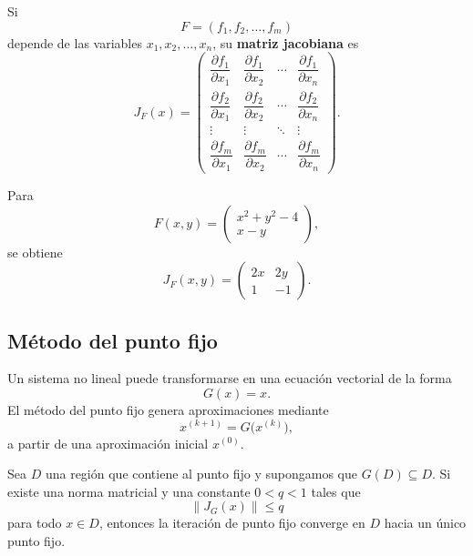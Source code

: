 \documentclass[a4,11pt]{aleph-notas}
\begin{document}
\begin{defi}
    Si
    \[
        F=(f_1,f_2,\ldots,f_m)
    \]
    depende de las variables $x_1,x_2,\ldots,x_n$, su \textbf{matriz jacobiana} es
    \[
        J_{F}({x})
        =
        \begin{pmatrix}
            \dfrac{\partial f_1}{\partial x_1} &
            \dfrac{\partial f_1}{\partial x_2} &
            \cdots &
            \dfrac{\partial f_1}{\partial x_n}\\[5mm]
            \dfrac{\partial f_2}{\partial x_1} &
            \dfrac{\partial f_2}{\partial x_2} &
            \cdots &
            \dfrac{\partial f_2}{\partial x_n}\\[2mm]
            \vdots & \vdots & \ddots & \vdots\\[2mm]
            \dfrac{\partial f_m}{\partial x_1} &
            \dfrac{\partial f_m}{\partial x_2} &
            \cdots &
            \dfrac{\partial f_m}{\partial x_n}
        \end{pmatrix}.
    \]
\end{defi}

\begin{ejem}
    Para
    \[
        F(x,y)=
        \begin{pmatrix}
            x^2+y^2-4\\
            x-y
        \end{pmatrix},
    \]
    se obtiene
    \[
        J_{{F}}(x,y)=
        \begin{pmatrix}
            2x & 2y\\
            1 & -1
        \end{pmatrix}.
    \]
\end{ejem}

\subsection{Método del punto fijo}

\begin{defi}
    Un sistema no lineal puede transformarse en una ecuación vectorial de la forma
    \[
        G(x) = x.
    \]
    El método del punto fijo genera aproximaciones mediante
    \[
        {x}^{(k+1)}={G}\bigl({x}^{(k)}\bigr),
    \]
    a partir de una aproximación inicial ${x}^{(0)}$.
\end{defi}

\begin{teo}
    Sea $D$ una región que contiene al punto fijo y supongamos que ${G}(D)\subseteq D$. Si existe una norma matricial y una constante $0<q<1$ tales que
    \[
        \left\|J_{{G}}({x})\right\|\leq q
    \]
    para todo ${x}\in D$, entonces la iteración de punto fijo converge en $D$ hacia un único punto fijo.
\end{teo}
\end{document}
